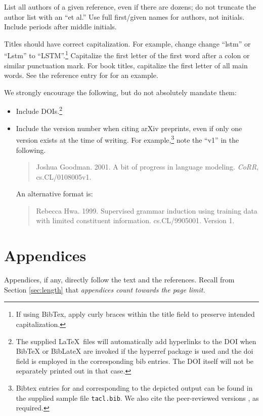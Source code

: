 \documentclass[11pt,a4paper]{article}
\begin{document}
List all authors of a given reference, even if there are dozens; do not
truncate the author list with an ``et al.''  Use full first/given names for
authors, not initials.  Include periods after middle initials.

Titles should have correct capitalization.  For example, change change
``lstm'' or ``Lstm'' to ``LSTM''.\footnote{If using BibTex, apply curly braces
within the title field to preserve intended capitalization.}   Capitalize the
first letter of the first word after a colon or similar punctuation mark.  For
book titles, capitalize the first letter of all main words.  See the
reference entry for \citet{Jurafsky+Martin:2009a} for an example.


We strongly encourage the following, but do not absolutely mandate them:
\begin{itemize}
\item Include DOIs.\footnote{The supplied \LaTeX\ files will
automatically add hyperlinks to the DOI when BibTeX or
BibLateX are invoked if the hyperref package is used and
the doi field is employed in the corresponding bib entries.
The DOI itself will not be separately printed out in that case.}
\item Include the version number when citing arXiv preprints, even if only one
version exists at the time of writing.
For example,\footnote{Bibtex entries for \citet{DBLP:journals/corr/cs-CL-0108005} and
\citet{DBLP:journals/corr/cs-CL-9905001} corresponding to the depicted output
can be found in the supplied sample file {\tt tacl.bib}.  We also cite
the peer-reviewed versions \cite{GOODMAN2001403,P99-1010}, as required.}
note the ``v1'' in the following.
\begin{quote}
Joshua Goodman.  2001.  A bit of progress in language modeling. {\it CoRR},
cs.CL/0108005v1.
\end{quote}
An alternative format is:
\begin{quote}
Rebecca Hwa. 1999. Supervised grammar induction using training data with limited constituent
information. {cs.CL/9905001}. Version 1.
\end{quote}
\end{itemize}

\section{Appendices} Appendices, if any, directly follow the text and the
references.  Recall from Section \ref{sec:length} that {\em appendices count
towards the page
limit.}
\end{document}
